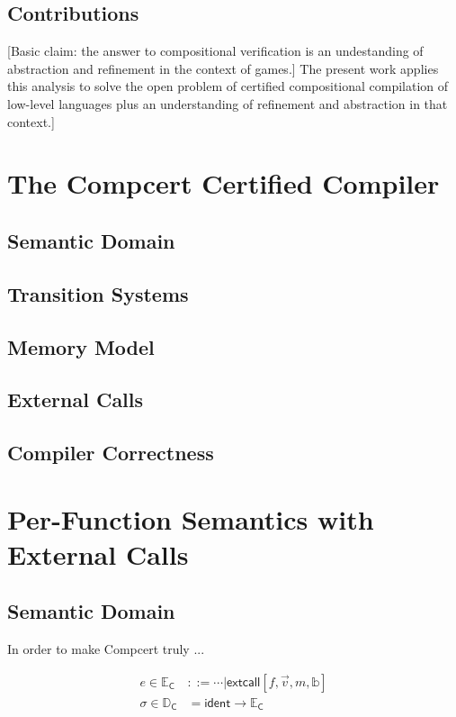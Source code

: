 \documentclass[sigplan,10pt,review,anonymous]{acmart}
\newcommand{\kw}[1]{\ensuremath{ \textsf{#1} }}
\begin{document}
\subsection{Contributions} %

[Basic claim: the answer to compositional verification
is an undestanding of abstraction and refinement in the context of games.]
The present work applies this analysis to
solve the open problem of certified compositional compilation of low-level languages
plus an understanding of refinement and abstraction in that context.]



\section{The Compcert Certified Compiler} %

\subsection{Semantic Domain}
\subsection{Transition Systems}
\subsection{Memory Model}
\subsection{External Calls}
\subsection{Compiler Correctness}


\section{Per-Function Semantics with External Calls} %

\subsection{Semantic Domain}

In order to make Compcert truly ...

\begin{align*}
  e \in \mathbb{E}_\kw{C} &::=
    \cdots | \kw{extcall}[f, \vec{v}, m, \mathbb{b}] \\
  \sigma \in \mathbb{D}_\kw{C} &=
    \kw{ident} \rightarrow \mathbb{E}_\kw{C}
\end{align*}
\end{document}
